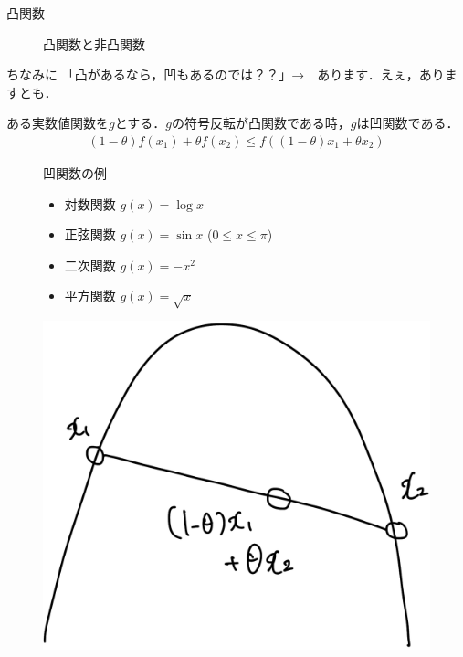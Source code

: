 \documentclass[aspectratio=169, dvipdfmx, 10.5pt]{beamer} %
\begin{document}
\begin{frame}{凸関数}
\begin{figure}[htbp]
\begin{minipage}[b]{0.45\textwidth}
		\end{minipage}
		\caption{凸関数と非凸関数}
	\end{figure}
\end{frame}


\begin{frame}{ちなみに}
    「凸があるなら，凹もあるのでは？？」→　あります．えぇ，ありますとも．
    \par
    \par
    \begin{definition}[凹関数]
        ある実数値関数を$g$とする．$g$の符号反転が凸関数である時，$g$は\alert{凹関数}である．  
    \begin{align}
        (1 - \theta)f(x_1) + \theta f(x_2) \leq f \left( (1 - \theta)x_1 + \theta x_2 \right)
    \end{align}
    \end{definition}
    \centering
    \begin{figure}[htbp]
		\begin{minipage}[b]{0.48\textwidth}
			凹関数の例
            \begin{itemize}
                \item 対数関数 $g(x) = \log x$
                \item 正弦関数 $g(x) = \sin x$ ($0 \leq x \leq \pi$)
                \item 二次関数 $g(x) = -x^2$
                \item 平方関数 $g(x) = \sqrt{x}$
            \end{itemize}
    	\end{minipage}
		\begin{minipage}[b]{0.48\textwidth}
			\centering
			\includegraphics[keepaspectratio, scale=0.1]{concave_function.png}
		\end{minipage}
	\end{figure}
\end{frame}
\end{document}
